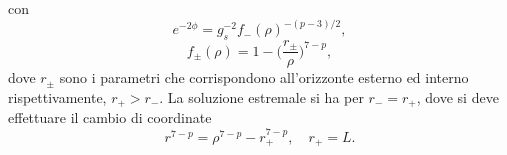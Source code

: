 con 
\begin{equation}
    e^{-2\phi} = g_s^{-2}f_-(\rho)^{-(p - 3)/2},
\end{equation}
\begin{equation}
    f_\pm(\rho) = 1 - \bigg(\frac{r_\pm}{\rho}\bigg)^{7 - p},
\end{equation}
dove $r_\pm$ sono i parametri che corrispondono all'orizzonte esterno ed interno rispettivamente, $r_+ > r_-$. La soluzione estremale si ha per $r_- = r_+$, dove si deve effettuare il cambio di coordinate 
\begin{equation}
    r^{7 - p} = \rho^{7 - p} - r_+^{7 - p},\quad r_+ = L.
\end{equation}




